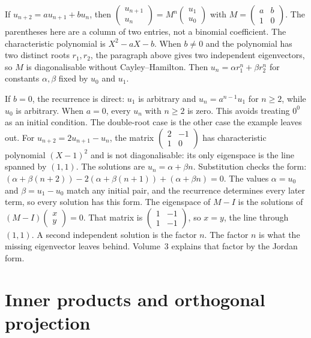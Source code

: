 \begin{example}
If $u_{n+2}=au_{n+1}+bu_n$, then $\begin{pmatrix}u_{n+1}\\ u_n\end{pmatrix}=M^n\begin{pmatrix}u_1\\ u_0\end{pmatrix}$ with $M=\begin{pmatrix}a&b\\1&0\end{pmatrix}$. The parentheses here are a column of two entries, not a binomial coefficient. The characteristic polynomial is $X^2-aX-b$. When $b\ne0$ and the polynomial has two distinct roots $r_1,r_2$, the paragraph above gives two independent eigenvectors, so $M$ is diagonalisable without Cayley--Hamilton. Then $u_n=\alpha r_1^n+\beta r_2^n$ for constants $\alpha,\beta$ fixed by $u_0$ and $u_1$.
\end{example}

If $b=0$, the recurrence is direct: $u_1$ is arbitrary and $u_n=a^{n-1}u_1$ for $n\ge2$, while $u_0$ is arbitrary. When $a=0$, every $u_n$ with $n\ge2$ is zero. This avoids treating $0^0$ as an initial condition. The double-root case is the other case the example leaves out. For $u_{n+2}=2u_{n+1}-u_n$, the matrix $\begin{pmatrix}2&-1\\1&0\end{pmatrix}$ has characteristic polynomial $(X-1)^2$ and is not diagonalisable: its only eigenspace is the line spanned by $(1,1)$. The solutions are $u_n=\alpha+\beta n$. Substitution checks the form: $(\alpha+\beta(n+2))-2(\alpha+\beta(n+1))+(\alpha+\beta n)=0$. The values $\alpha=u_0$ and $\beta=u_1-u_0$ match any initial pair, and the recurrence determines every later term, so every solution has this form. The eigenspace of $M-I$ is the solutions of $(M-I)\begin{pmatrix}x\\ y\end{pmatrix}=0$. That matrix is $\begin{pmatrix}1&-1\\1&-1\end{pmatrix}$, so $x=y$, the line through $(1,1)$. A second independent solution is the factor $n$. The factor $n$ is what the missing eigenvector leaves behind. Volume~3 explains that factor by the Jordan form.

\section{Inner products and orthogonal projection}


